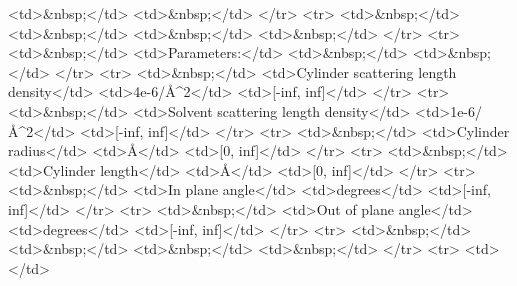 \textless{}td\textgreater{}\&nbsp;\textless{}/td\textgreater{} \textless{}td\textgreater{}\&nbsp;\textless{}/td\textgreater{} \textless{}/tr\textgreater{} \textless{}tr\textgreater{} \textless{}td\textgreater{}\&nbsp;\textless{}/td\textgreater{} \textless{}td\textgreater{}\&nbsp;\textless{}/td\textgreater{} \textless{}td\textgreater{}\&nbsp;\textless{}/td\textgreater{} \textless{}td\textgreater{}\&nbsp;\textless{}/td\textgreater{} \textless{}/tr\textgreater{} \textless{}tr\textgreater{} \textless{}td\textgreater{}\&nbsp;\textless{}/td\textgreater{} \textless{}td\textgreater{}Parameters:\textless{}/td\textgreater{} \textless{}td\textgreater{}\&nbsp;\textless{}/td\textgreater{} \textless{}td\textgreater{}\&nbsp;\textless{}/td\textgreater{} \textless{}/tr\textgreater{} \textless{}tr\textgreater{} \textless{}td\textgreater{}\&nbsp;\textless{}/td\textgreater{} \textless{}td\textgreater{}Cylinder scattering length density\textless{}/td\textgreater{} \textless{}td\textgreater{}4e-6/\AA{}\textasciicircum{}2\textless{}/td\textgreater{} \textless{}td\textgreater{}[-inf, inf]\textless{}/td\textgreater{} \textless{}/tr\textgreater{} \textless{}tr\textgreater{} \textless{}td\textgreater{}\&nbsp;\textless{}/td\textgreater{} \textless{}td\textgreater{}Solvent scattering length density\textless{}/td\textgreater{} \textless{}td\textgreater{}1e-6/\AA{}\textasciicircum{}2\textless{}/td\textgreater{} \textless{}td\textgreater{}[-inf, inf]\textless{}/td\textgreater{} \textless{}/tr\textgreater{} \textless{}tr\textgreater{} \textless{}td\textgreater{}\&nbsp;\textless{}/td\textgreater{} \textless{}td\textgreater{}Cylinder radius\textless{}/td\textgreater{} \textless{}td\textgreater{}\AA{}\textless{}/td\textgreater{} \textless{}td\textgreater{}[0, inf]\textless{}/td\textgreater{} \textless{}/tr\textgreater{} \textless{}tr\textgreater{} \textless{}td\textgreater{}\&nbsp;\textless{}/td\textgreater{} \textless{}td\textgreater{}Cylinder length\textless{}/td\textgreater{} \textless{}td\textgreater{}\AA{}\textless{}/td\textgreater{} \textless{}td\textgreater{}[0, inf]\textless{}/td\textgreater{} \textless{}/tr\textgreater{} \textless{}tr\textgreater{} \textless{}td\textgreater{}\&nbsp;\textless{}/td\textgreater{} \textless{}td\textgreater{}In plane angle\textless{}/td\textgreater{} \textless{}td\textgreater{}degrees\textless{}/td\textgreater{} \textless{}td\textgreater{}[-inf, inf]\textless{}/td\textgreater{} \textless{}/tr\textgreater{} \textless{}tr\textgreater{} \textless{}td\textgreater{}\&nbsp;\textless{}/td\textgreater{} \textless{}td\textgreater{}Out of plane angle\textless{}/td\textgreater{} \textless{}td\textgreater{}degrees\textless{}/td\textgreater{} \textless{}td\textgreater{}[-inf, inf]\textless{}/td\textgreater{} \textless{}/tr\textgreater{} \textless{}tr\textgreater{} \textless{}td\textgreater{}\&nbsp;\textless{}/td\textgreater{} \textless{}td\textgreater{}\&nbsp;\textless{}/td\textgreater{} \textless{}td\textgreater{}\&nbsp;\textless{}/td\textgreater{} \textless{}td\textgreater{}\&nbsp;\textless{}/td\textgreater{} \textless{}/tr\textgreater{} \textless{}tr\textgreater{} \textless{}td\textgreater{}\textless{}/td\textgreater{}

